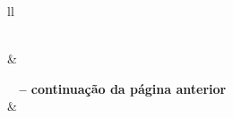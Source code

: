 {\tiny
\begin{center}
\begin{longtable}[H]{ll}  
   \caption{Lista de instituições de ensino superior com dummy de aderência à greve}
  \label{tab:lista_de_ies} \\
  
    &   \\ \hline 
\endfirsthead

%
{{\bfseries \tablename\ \thetable{} -- continuação da página anterior}} \\
  &  \\ \hline 
\endhead

\hline {} \\ \hline
\endfoot


\end{longtable}
\end{center}}
